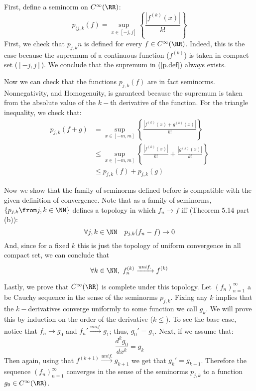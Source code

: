 First,  define a seminorm on $C^\infty(\RR)$:
\begin{equation}
    p_{(j,k}(f)= \sup_{x\in [-j,j]} \left\{ \frac{|f^{(k)}(x) |}{k!}\right\} \label{p.def}
\end{equation}
First, we check that $p_{j,k}n$ is defined for every $f\in C^\infty(\RR)$.
Indeed, this is the case because the supremum of a continuous function ($f^{(k)}$) is taken in compact set ($[-j,j]$).
We conclude that the supremum in (\ref{p.def}) always exists.

Now we can check that the functions $p_{j,k}(f)$ are in fact seminorms. 
Nonnegativity, and Homogenuity, is garanteed because the supremum is taken from the absolute value of the $k-$th derivative of the function.
For the triangle inequality, we check that:
\begin{align*}
p_{j,k}(f+g) & = \sup_{x\in [-m,m]} \left\{ \frac{|f^{(k)}(x) + g^{(k)}(x)  |}{k!} \right\}\\
&\leq \sup_{x\in [-m,m]} \left\{ \frac{|f^{(k)}(x) |}{k!} +\frac{|g^{(k)}(x) |}{k!}  \right\}\\
&\leq p_{j,k}(f) + p_{j,k}(g)
\end{align*}

Now we show that the family of seminorms defined before is compatible with the given definition of convergence. 
Note that as a family of seminorms, $\{p_{j,k} \from j,k\in \NN\}$ defines a topology in which $f_n\to f$ iff (Theorem 5.14 part (b)):
$$\forall j,k\in\NN\quad p_{j,k}(f_n-f)\to 0$$
And, since for a fixed $k$ this is just the topology of uniform convergence in all compact set, we can conclude that 
$$\forall k\in \NN ,\ f_n^{(k)}\xrightarrow{unif.}  f^{(k)}$$

Lastly, we prove that $C^\infty(\RR)$ is complete under this topology.
Let $(f_n)_{n=1}^{\infty}$ a be Cauchy sequence in the sense of the seminorms $p_{j,k}$.
Fixing any $k$ implies that the $k-$derivatives converge uniformly to some function we call $g_k$.
We will prove this by induction on the order of the derivative ($k\leq$).
To see the base case, notice that $f_n\to g_0$ and $f_n' \xrightarrow{unif.} g_1$; thus, $g_0'=g_1$. 
Next, if we assume that: 
$$\frac{d^k g_0}{dx^k}=g_{k}$$ 
Then again, using that  $f^{(k+1)}\xrightarrow{unif.}g_{k+1}$ we get that $g_k'=g_{k+1} $.
Therefore the sequence $(f_n)_{n=1}^{\infty}$ converges in the sense of the seminorms $p_{j,k}$ to a function $g_0 \in C^\infty(\RR)$.
